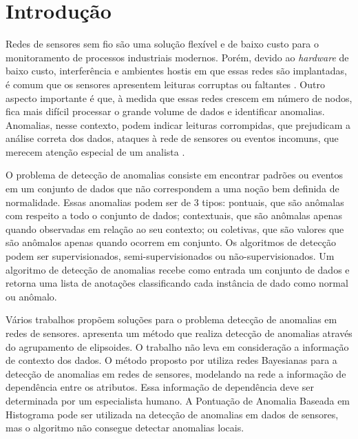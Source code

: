 \documentclass[cic,tc]{iiufrgs}
\begin{document}

\tableofcontents

\chapter{Introdução}

Redes de sensores sem fio são uma solução flexível e de baixo custo para o monitoramento de processos industriais modernos. Porém, devido ao \textit{hardware} de baixo custo, interferência e ambientes hostis em que essas redes são implantadas, é comum que os sensores apresentem leituras corruptas ou faltantes \cite{wireless2002}. Outro aspecto importante é que, à medida que essas redes crescem em número de nodos, fica mais difícil processar o grande volume de dados e identificar anomalias. Anomalias, nesse contexto, podem indicar leituras corrompidas, que prejudicam a análise correta dos dados, ataques à rede de sensores ou eventos incomuns, que merecem atenção especial de um analista \cite{AnomalyDetectionSurvey2009}.

O problema de detecção de anomalias consiste em encontrar padrões ou eventos em um conjunto de dados que não correspondem a uma noção bem definida de normalidade. Essas anomalias podem ser de 3 tipos: pontuais, que são anômalas com respeito a todo o conjunto de dados; contextuais, que são anômalas apenas quando observadas em relação ao seu contexto; ou coletivas, que são valores que são anômalos apenas quando ocorrem em conjunto. Os algoritmos de detecção podem ser supervisionados, semi-supervisionados ou não-supervisionados. Um algoritmo de detecção de anomalias recebe como entrada um conjunto de dados e retorna uma lista de anotações classificando cada instância de dado como normal ou anômalo.

Vários trabalhos propõem soluções para o problema detecção de anomalias em redes de sensores. \cite{Ellipsoids2009} apresenta um método que realiza detecção de anomalias através do agrupamento de elipsoides. O trabalho não leva em consideração a informação de contexto dos dados. O método proposto por \cite{BayesianBelief} utiliza redes Bayesianas para a detecção de anomalias em redes de sensores, modelando na rede a informação de dependência entre os atributos. Essa informação de dependência deve ser determinada por um especialista humano. A Pontuação de Anomalia Baseada em Histograma \cite{hbos2012} pode ser utilizada na detecção de anomalias em dados de sensores, mas o algoritmo não consegue detectar anomalias locais.
\end{document}

